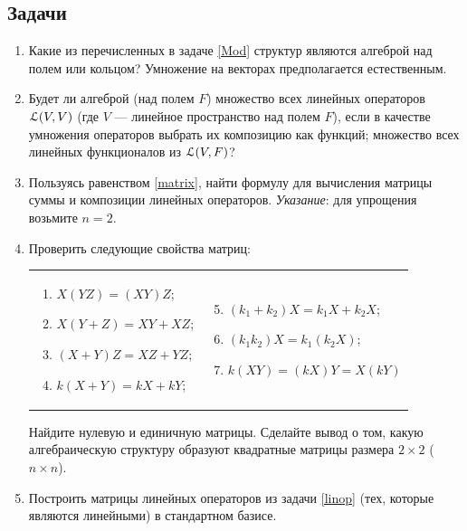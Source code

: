 \subsection*{Задачи}

\begin{enumerate}
\item Какие из перечисленных в задаче \ref{Mod} структур являются алгеброй над полем или кольцом? Умножение на векторах предполагается естественным.

\item Будет ли алгеброй (над полем $F$) \ipunkt множество всех линейных операторов $\mathcal L(V,V)$ (где $V$ --- линейное пространство над полем $F$), если в качестве умножения операторов выбрать их композицию как функций; \ipunkt множество всех линейных функционалов из $\mathcal L(V,F)$?

\item Пользуясь равенством \eqref{matrix}, найти формулу для вычисления матрицы суммы и композиции линейных операторов. \textit{Указание}: для упрощения возьмите $n=2$.

\item Проверить следующие свойства матриц:

\begin{tabular}{ll}
\begin{minipage}{0.5\linewidth}
\begin{enumerate}
\item $X(YZ)=(XY)Z$;
\item $X(Y+Z)=XY+XZ$;
\item $(X+Y)Z=XZ+YZ$;
\item $k(X+Y)=kX+kY$;
\end{enumerate}
\end{minipage}
&
\begin{minipage}{0.5\linewidth}
\begin{enumerate}\setcounter{enumii}{4}
\item $(k_1+k_2)X=k_1X+k_2X$;
\item $(k_1k_2)X=k_1(k_2X)$;
\item $k(XY)=(kX)Y=X(kY)$
\end{enumerate}
\end{minipage}
\end{tabular}
Найдите нулевую и единичную матрицы. Сделайте вывод о том, какую алгебраическую структуру образуют квадратные матрицы размера $2\times 2$ ($n\times n$).

\item Построить матрицы линейных операторов из задачи \ref{linop} (тех, которые являются линейными) в стандартном базисе.


\end{enumerate}

